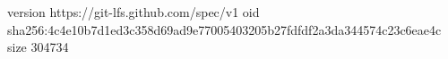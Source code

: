 version https://git-lfs.github.com/spec/v1
oid sha256:4c4e10b7d1ed3c358d69ad9e77005403205b27fdfdf2a3da344574c23c6eae4c
size 304734
